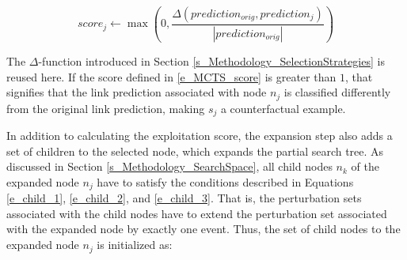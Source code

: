 \begin{equation}
    \label{e_MCTS_score}
    score_j \gets \max\left(0, \frac{\Delta(prediction_{orig}, prediction_j)}{|prediction_{orig}|}\right)
\end{equation}

The $\Delta$-function introduced in Section \ref{s_Methodology_SelectionStrategies} is reused here. If the score defined in \ref{e_MCTS_score} is greater than $1$, that signifies that the link prediction associated with node $n_j$ is classified differently from the original link prediction, making $s_j$ a counterfactual example.

In addition to calculating the exploitation score, the expansion step also adds a set of children to the selected node, which expands the partial search tree. As discussed in Section \ref{s_Methodology_SearchSpace}, all child nodes $n_k$ of the expanded node $n_j$ have to satisfy the conditions described in Equations \ref{e_child_1}, \ref{e_child_2}, and \ref{e_child_3}. That is, the perturbation sets associated with the child nodes have to extend the perturbation set associated with the expanded node by exactly one event. Thus, the set of child nodes to the expanded node $n_j$ is initialized as:








